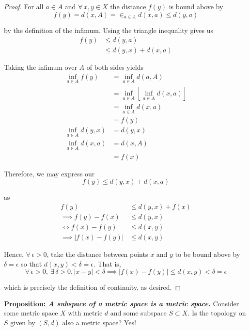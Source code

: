 \documentclass[12pt]{article}
\begin{document}
\begin{proof} For all $a \in A$ and $\forall\,x,y \in X$ the distance $f(y)$ is bound above by
\begin{equation*}
	f(y) = d(x,A) = \in_{a\in A} d(x,a) \leq d(y, a)
\end{equation*}

by the definition of the infimum. Using the triangle inequality gives us
\begin{align*}
	f(y) &\leq d(y, a) \\
	&\leq d(y, x) + d(x, a) 
\end{align*}

Taking the infimum over $A$ of both sides yields
\begin{align*}
	\inf_{a \in A} f(y) &= \inf_{a\in A} d(a, A) \\
	&= \inf_{a\in A} \left[ \inf_{a \in A} d(x, a) \right] \\
	&= \inf_{a \in A} d(x, a) \\
	&= f(y) \\
	\inf_{a \in A} d(y, x) &= d(y, x) \\
	\inf_{a \in A} d(x, a) &= d(x, A) \\
	&= f(x) 
\end{align*}

Therefore, we may express our 
\begin{equation*}
	f(y) \leq d(y, x) + d(x, a)
\end{equation*}

as
\begin{align*}
	f(y) &\leq d(y, x) + f(x) \\
	\implies f(y) - f(x) &\leq d(y, x) \\
	\iff f(x) - f(y) &\leq d(x, y) \\
	\implies |f(x) - f(y)| &\leq d(x, y)
\end{align*}

Hence, $\forall\,\epsilon > 0$, take the distance between points $x$ and $y$ to be bound above by $\delta = \epsilon$ so that $d(x, y) < \delta = \epsilon$. That is,
\begin{equation*}
	\forall\,\epsilon > 0,~\exists\,\delta > 0, |x - y| < \delta \implies |f(x) - f(y)| \leq d(x, y) < \delta = \epsilon
\end{equation*}

which is precisely the definition of continuity, as desired.
\end{proof}

%
%
{\bf Proposition: {\em A subspace of a metric space is a metric space.}} Consider some metric space $X$ with metric $d$ and some subspace $S\subset X$. Is the topology on $S$ given by $(S, d)$ also a metric space? Yes!
\end{document}
